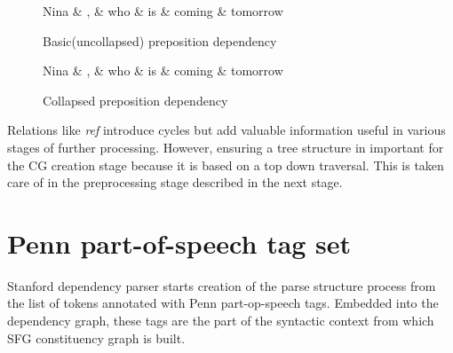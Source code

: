 \begin{figure}
	\centering
	\begin{minipage}[b]{0.45\textwidth}
		
		\begin{dependency}
			\begin{deptext}[]
				Nina \& , \& who \& is \& coming \& tomorrow\\ %
			\end{deptext}
		\end{dependency}
		\caption{Basic(uncollapsed) preposition dependency}
		\label{fig:rel-transf1}
	\end{minipage}
	\quad
	\begin{minipage}[b]{0.45\textwidth}
		\centering
		\begin{dependency}
			\begin{deptext}[]
				Nina \& , \& who \& is \& coming \& tomorrow\\ %
			\end{deptext}
		\end{dependency}
		\caption{Collapsed preposition dependency}
		\label{fig:rel-transf2}
	\end{minipage}
\end{figure}

Relations like \textit{ref} introduce cycles but add valuable information useful in various stages of further processing. However, ensuring a tree structure in important for the CG creation stage because it is based on a top down traversal. This is taken care of in the preprocessing stage described in the next stage.

\section{Penn part-of-speech tag set}
Stanford dependency parser starts creation of the parse structure process from the list of tokens annotated with Penn part-op-speech tags. Embedded into the dependency graph, these tags are the part of the syntactic context from which SFG constituency graph is built. 

